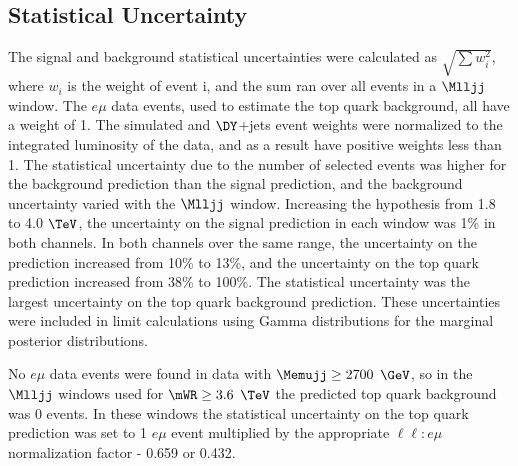 \subsection{Statistical Uncertainty}
\label{sec:statUnc}
The signal and background statistical uncertainties were calculated as $\sqrt{\sum w_{i}^{2}}$, where $w_{i}$ is the weight 
of event i, and the sum ran over all events in a $\Mlljj$ window.  The $e\mu$ data events, used to estimate the top quark 
background, all have a weight of 1.  The simulated \WR and $\DY$+jets event weights were normalized to the integrated 
luminosity of the data, and as a result have positive weights less than 1.  The statistical uncertainty due to the number 
of selected events was higher for the background prediction than the signal prediction, and the background uncertainty 
varied with the $\Mlljj$ window.  Increasing the \mWR hypothesis from 1.8 to 4.0 $\TeV$, the uncertainty on the signal 
prediction in each window was 1\% in both channels.  In both channels over the same \mWR range, the uncertainty on the \DY 
prediction increased from 10\% to 13\%, and the uncertainty on the top quark prediction increased from 38\% to 100\%.  The 
statistical uncertainty was the largest uncertainty on the top quark background prediction.  These uncertainties were included 
in limit calculations using Gamma distributions for the marginal posterior distributions.

No $e\mu$ data events were found in data with $\Memujj \geq 2700$ $\GeV$, so in the $\Mlljj$ windows used for $\mWR \geq 3.6$ $\TeV$ 
the predicted top quark background was 0 events.  In these windows the statistical uncertainty on the top quark prediction 
was set to 1 $e\mu$ event multiplied by the appropriate $\ell\ell:e\mu$ normalization factor - 0.659 or 0.432.


